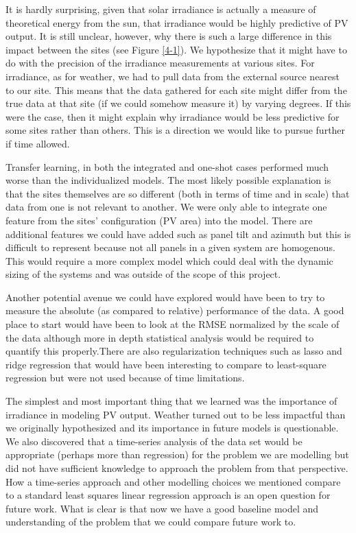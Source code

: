 \documentclass[11pt, fullpage,letterpaper]{article}
\begin{document}
It is hardly surprising, given that solar irradiance is actually a measure of theoretical energy from the sun, that irradiance would be highly predictive of PV output. It is still unclear, however, why there is such a large difference in this impact between the sites (see Figure \ref{4-1}). We hypothesize that it might have to do with the precision of the irradiance measurements at various sites. For irradiance, as for weather, we had to pull data from the external source nearest to our site. This means that the data gathered for each site might differ from the true data at that site (if we could somehow measure it) by varying degrees. If this were the case, then it might explain why irradiance would be less predictive for some sites rather than others. This is a direction we would like to pursue further if time allowed.

Transfer learning, in both the integrated and one-shot cases performed much worse than the individualized models. The most likely possible explanation is that the sites themselves are so different (both in terms of time and in scale) that data from one is not relevant to another. We were only able to integrate one feature from the sites’ configuration (PV area) into the model. There are additional features we could have added such as panel tilt and azimuth but this is difficult to represent because not all panels in a given system are homogenous. This would require a more complex model which could deal with the dynamic sizing of the systems  and was outside of the scope of this project.
    
Another potential avenue we could have explored would have been to try to measure the absolute (as compared to relative) performance of the data. A good place to start would have been to look at the RMSE normalized by the scale of the data although more in depth statistical analysis would be required to quantify this properly.There are also regularization techniques such as lasso and ridge regression that would have been interesting to compare to least-square regression but were not used because of time limitations.
    
The simplest and most important thing that we learned was the importance of irradiance in modeling PV output. Weather turned out to be less impactful than we originally hypothesized and its importance in future models is questionable. We also discovered that a time-series analysis of the data set would be appropriate (perhaps more than regression) for the problem we are modelling but did not have sufficient knowledge to approach the problem from that perspective. How a time-series approach and other modelling choices we mentioned compare to a standard least squares linear regression approach is an open question for future work. What is clear is that now we have a good baseline model and understanding of the problem that we could compare future work to. 
\end{document}
